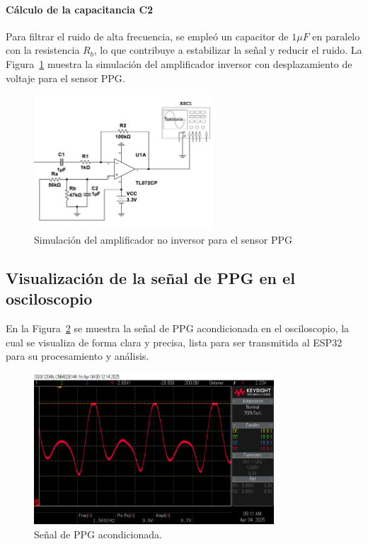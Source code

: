         \paragraph{Cálculo de la capacitancia C2}

        Para filtrar el ruido de alta frecuencia, se empleó un capacitor de $1 \mu F$ en paralelo con la resistencia $R_b$, lo que contribuye a estabilizar la señal y reducir el ruido. La Figura~\ref{fig:Simulacion_Amplificador_Inversor_PPG} muestra la simulación del amplificador inversor con desplazamiento de voltaje para el sensor PPG.

        \begin{figure}[H]
            \centering
            \includegraphics[width=0.6\textwidth]{img/Desarrollo/multisim_AmpInversor_ppg.png}
            \caption[Simulación del amplificador no inversor para el sensor PPG.]{Simulación del amplificador no inversor para el sensor PPG\footnotemark}
            \label{fig:Simulacion_Amplificador_Inversor_PPG}
        \end{figure}

    \subsection{Visualización de la señal de PPG en el osciloscopio}
    En la Figura~\ref{fig:PPG_Osciloscopio} se muestra la señal de PPG acondicionada en el osciloscopio, la cual se visualiza de forma clara y precisa, lista para ser transmitida al ESP32 para su procesamiento y análisis.

    \begin{figure}[H]
        \centering
        \includegraphics[width=0.8\textwidth]{img/Desarrollo/ppg_osciloscopio.png}
        \caption{Señal de PPG acondicionada.}
        \label{fig:PPG_Osciloscopio}
    \end{figure}